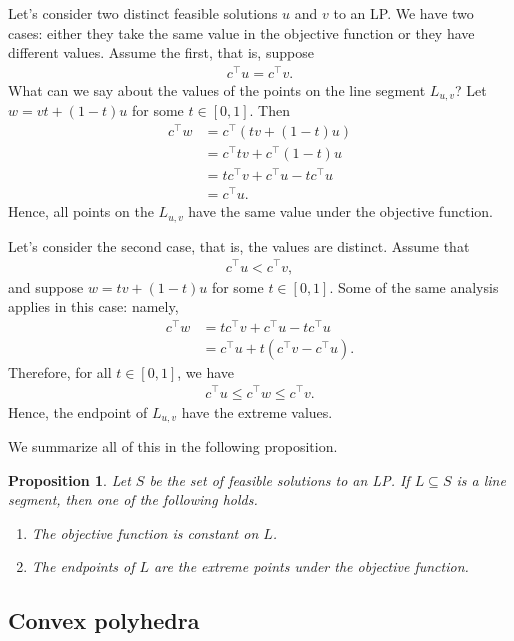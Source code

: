 \documentclass[a4paper, 12pt]{article}
\numberwithin{equation}{section}
\numberwithin{figure}{section}
\newtheorem{prop}[thm]{Proposition}
\theoremstyle{definition}
\renewcommand{\leq}{\leqslant}
\begin{document}
Let's consider two distinct feasible solutions $u$ and $v$ to an LP. We have two
cases: either they take the same value in the objective function or they have
different values. Assume the first, that is, suppose 
\begin{align*}
	c^{\top}u = c^{\top}v.
\end{align*}
What can we say about the values of the points on the line segment $L_{u,v}$?
Let $w = vt + (1 - t)u$ for some $t\in [0, 1]$. Then 
\begin{align*}
	c^{\top}w &= c^{\top}(tv + (1 - t)u) \\
	&= c^{\top}tv + c^{\top}(1-t)u \\
	&= tc^{\top}v + c^{\top}u - tc^{\top}u \\
	&= c^{\top}u.
\end{align*}
Hence, all points on the $L_{u,v}$ have the same value under the objective
function. 

Let's consider the second case, that is, the values are distinct. Assume that 
\begin{align*}
	c^{\top} u < c^{\top}v,
\end{align*}
and suppose $w = tv + (1-t)u$ for some $t\in [0,1]$. Some of the same analysis applies in this case: namely, 
\begin{align*}
	c^{\top}w &= tc^{\top}v + c^{\top}u - tc^{\top}u \\
	&= c^{\top}u + t(c^{\top}v - c^{\top}u).
\end{align*}
Therefore, for all $t\in [0,1]$, we have 
\begin{align*}
	c^{\top}u \leq c^{\top}w \leq c^{\top}v.
\end{align*}
Hence, the endpoint of $L_{u,v}$ have the extreme values. 

We summarize all of this in the following proposition. 

\begin{prop}
	Let $S$ be the set of feasible solutions to an LP. If $L\subseteq S$ is a
	line segment, then one of the following holds.
	\begin{enumerate}
		\item The objective function is constant on $L$.
		\item The endpoints of $L$ are the extreme points under the objective
		function. 
	\end{enumerate}
\end{prop}

\subsection{Convex polyhedra}


















\newpage

 

\end{document}

